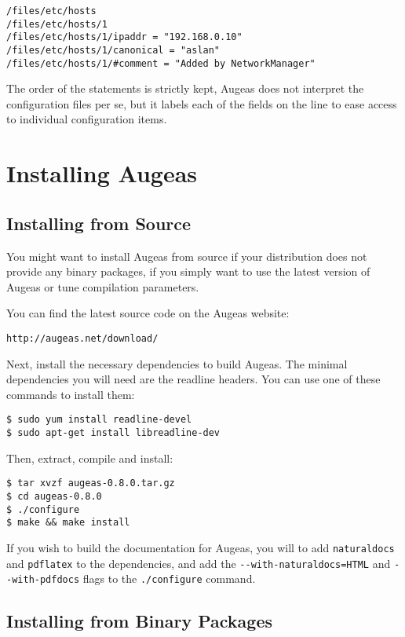 \begin{verbatim}
/files/etc/hosts
/files/etc/hosts/1
/files/etc/hosts/1/ipaddr = "192.168.0.10"
/files/etc/hosts/1/canonical = "aslan"
/files/etc/hosts/1/#comment = "Added by NetworkManager"
\end{verbatim}
The order of the statements is strictly kept, Augeas does not interpret the configuration files per se, but it labels each of the fields on the line to ease access to individual configuration items.

\section{Installing Augeas}

\label{sec:installing_augeas} 

\subsection{Installing from Source}


You might want to install Augeas from source if your distribution does not provide any binary packages, if you simply want to use the latest version of Augeas or tune compilation parameters.

You can find the latest source code on the Augeas website:

\begin{verbatim}
http://augeas.net/download/
\end{verbatim}
Next, install the necessary dependencies to build Augeas. The minimal dependencies you will need are the readline headers. You can use one of these commands to install them:

\begin{verbatim}
$ sudo yum install readline-devel
$ sudo apt-get install libreadline-dev
\end{verbatim}
Then, extract, compile and install:

\begin{verbatim}
$ tar xvzf augeas-0.8.0.tar.gz
$ cd augeas-0.8.0
$ ./configure
$ make && make install
\end{verbatim}
If you wish to build the documentation for Augeas, you will to add \verb!naturaldocs! and \verb!pdflatex! to the dependencies, and add the \verb!--with-naturaldocs=HTML! and \verb!--with-pdfdocs! flags to the \verb!./configure! command.

\subsection{Installing from Binary Packages}

